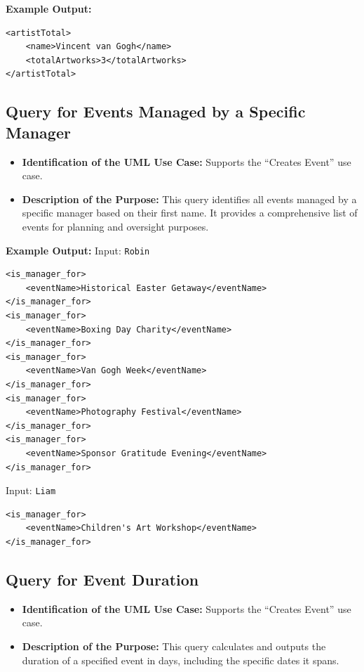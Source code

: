 \documentclass{article} %
\begin{document}
\textbf{Example Output:}
\begin{verbatim}
<artistTotal>
    <name>Vincent van Gogh</name>
    <totalArtworks>3</totalArtworks>
</artistTotal>
\end{verbatim}

\subsection{Query for Events Managed by a Specific Manager}
\begin{itemize}
    \item \textbf{Identification of the UML Use Case:} Supports the ``Creates Event'' use case.
    \item \textbf{Description of the Purpose:} This query identifies all events managed by a specific manager based on their first name. It provides a comprehensive list of events for planning and oversight purposes.
\end{itemize}

\textbf{Example Output:}  
Input: \texttt{Robin}
\begin{verbatim}
<is_manager_for>
    <eventName>Historical Easter Getaway</eventName>
</is_manager_for>
<is_manager_for>
    <eventName>Boxing Day Charity</eventName>
</is_manager_for>
<is_manager_for>
    <eventName>Van Gogh Week</eventName>
</is_manager_for>
<is_manager_for>
    <eventName>Photography Festival</eventName>
</is_manager_for>
<is_manager_for>
    <eventName>Sponsor Gratitude Evening</eventName>
</is_manager_for>
\end{verbatim}

Input: \texttt{Liam}
\begin{verbatim}
<is_manager_for>
    <eventName>Children's Art Workshop</eventName>
</is_manager_for>
\end{verbatim}

\subsection{Query for Event Duration}
\begin{itemize}
    \item \textbf{Identification of the UML Use Case:} Supports the ``Creates Event'' use case.
    \item \textbf{Description of the Purpose:} This query calculates and outputs the duration of a specified event in days, including the specific dates it spans.
\end{itemize}
\end{document}
